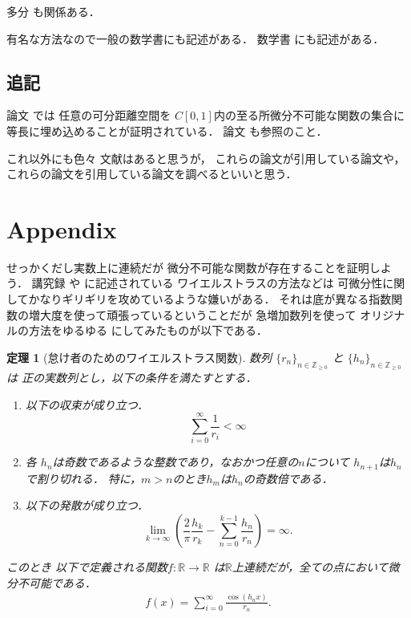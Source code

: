 \documentclass[leqno, a4paper, 12pt]{jsarticle}
\newtheorem{thm}{定理}
\newcommand{\zz}{\mathbb{Z}}
\newcommand{\rr}{\mathbb{R}}
\begin{document}
多分
\cite{Saks1932}
も関係ある．

有名な方法なので一般の数学書にも記述がある．
数学書
\cite{MR1411907}
にも記述がある．


\subsection{追記}
論文
\cite{MR1328375}
では
任意の可分距離空間を
$C[0, 1]$内の至る所微分不可能な関数の集合に
等長に埋め込めることが証明されている．
論文
\cite{MR1707147}
も参照のこと．

これ以外にも色々
文献はあると思うが，
これらの論文が引用している論文や，
これらの論文を引用している論文を調べるといいと思う．


\section{Appendix}\label{sec:app}
せっかくだし実数上に連続だが
微分不可能な関数が存在することを証明しよう．
講究録
\cite{wa5}や
\cite{johan2003}に記述されている
ワイエルストラスの方法などは
可微分性に関してかなりギリギリを攻めているような嫌いがある．
それは底が異なる指数関数の増大度を使って頑張っているということだが
急増加数列を使って
オリジナルの方法をゆるゆる
にしてみたものが以下である．
\begin{thm}[怠け者のためのワイエルストラス関数]\label{thm:app1}
数列
$\{r_{n}\}_{n\in \zz_{\ge 0}}$
と
$\{h_{n}\}_{n\in \zz_{\ge 0}}$
は
正の実数列とし，以下の条件を満たすとする．
\begin{enumerate}[label=\textup{(A\arabic*)}]
\item\label{item:sum} 
以下の収束が成り立つ．
\[
\sum_{i=0}^{\infty}\frac{1}{r_{i}}<\infty
\]
\item\label{item:integer}
各
$h_{n}$は奇数であるような整数であり，なおかつ任意の$n$について
$h_{n+1}$は$h_{n}$で割り切れる．
特に，$m>n$のとき$h_{m}$は$h_{n}$の奇数倍である．
\item\label{item:div}
以下の発散が成り立つ．
\[
\lim_{k\to \infty}
\left(
\frac{2}{\pi}
\frac{h_{k}}{r_{k}}
-
\sum_{n=0}^{k-1}\frac{h_{n}}{r_{n}}
\right)
=\infty. 
\]

\end{enumerate}
このとき
以下で定義される関数$f\colon \rr\to \rr$
は$\rr$上連続だが，全ての点において微分不可能である．
\begin{align*}
f(x)=\sum_{i=0}^{\infty}\frac{\cos(h_{n}x)}{r_{n}}. 
\end{align*}
\end{thm}
\end{document}
